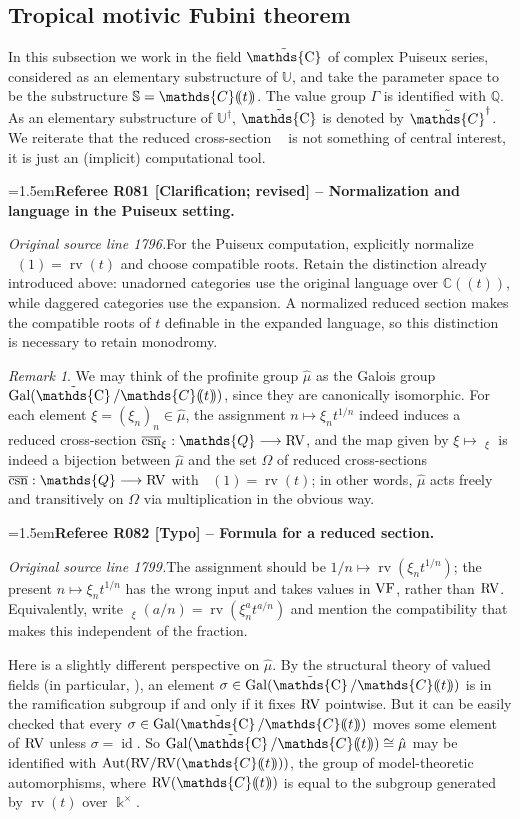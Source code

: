 \documentclass[12pt]{amsart}
\newcommand{\RefereeRemark}[4]{%
  \par\medskip\begingroup\normalfont\small\color{RefereePurple}%
  \emergencystretch=1.5em\noindent\textbf{Referee R#1 [#2] -- #3.}\par\nobreak\noindent #4\par
  \endgroup\medskip
}
\theoremstyle{plain}
\theoremstyle{definition}
\theoremstyle{remark}
\newtheorem{rem}[thm]{Remark}
\numberwithin{equation}{section}
\theoremstyle{plain}
\newcommand{\VF}{\textup{VF}}
\newcommand{\RV}{\textup{RV}}
\DeclareMathOperator{\id}{id}
\DeclareMathOperator{\aut}{Aut}
\DeclareMathOperator{\K}{\mathds{k}}
\newcommand{\C}{\mathds{C}}
\newcommand{\Q}{\mathds{Q}}
\newcommand{\0}{\emptyset}
\newcommand{\dpar}[1]{%
   (\mkern-4mu (#1 )\mkern-4mu )}
\newcommand{\bb}[1]{\mathbb{#1}}
\newcommand{\fun}{\longrightarrow}
\newcommand{\efun}{\longmapsto}
\DeclareMathOperator{\rv}{rv}
\DeclareMathOperator{\rcsn}{\overline {csn}}
\DeclareMathOperator{\gal}{Gal}
\DeclareMathOperator{\puC}{\tilde \C}
\begin{document}
\subsection{Tropical motivic Fubini theorem}\label{jp:fubini}

In this subsection we work in the field $\puC$ of complex Puiseux series, considered as an elementary substructure of $\bb U$, and take the parameter space  to be the substructure $\mathbb{S} = \C \dpar{ t }$. The value group $\Gamma$ is identified with $\Q$. As an elementary substructure of $\bb U^\dag$, $\puC$ is denoted by  $\tilde\C^{\dag}$. We reiterate that the reduced cross-section $\rcsn$ is not something of central interest, it is just an (implicit) computational tool.

\RefereeRemark{081}{Clarification; revised}{Normalization and language in the Puiseux setting}{%
\textit{Original source line 1796.}\quad For the Puiseux computation, explicitly normalize $\rcsn(1)=\rv(t)$ and choose compatible roots. Retain the distinction already introduced above: unadorned categories use the original language over $\mathbb C((t))$, while daggered categories use the expansion. A normalized reduced section makes the compatible roots of $t$ definable in the expanded language, so this distinction is necessary to retain monodromy.
}

\begin{rem}
We may think of the profinite group $\hat {\mu}$ as the Galois group $\gal(\puC / \C \dpar t)$, since they are canonically isomorphic. For each element $\xi = (\xi_n)_n \in \hat \mu$, the assignment $n \efun \xi_n t^{1/n}$ indeed induces a reduced cross-section $\rcsn_\xi : \Q \fun \RV$, and the map given by $\xi \efun \rcsn_\xi$ is indeed a bijection between $\hat \mu$ and the set $\Omega$ of reduced cross-sections $\rcsn : \Q \fun \RV$ with $\rcsn(1) = \rv(t)$; in other words, $\hat \mu$ acts freely and transitively on $\Omega$ via multiplication in the obvious way.

\RefereeRemark{082}{Typo}{Formula for a reduced section}{%
\textit{Original source line 1799.}\quad The assignment should be $1/n\mapsto\rv(\xi_n t^{1/n})$; the present $n\mapsto\xi_nt^{1/n}$ has the wrong input and takes values in $\VF$, rather than $\RV$. Equivalently, write $\rcsn_\xi(a/n)=\rv(\xi_n^a t^{a/n})$ and mention the compatibility that makes this independent of the fraction.
}

Here is a slightly different perspective on $\hat \mu$. By the structural theory of valued fields (in particular, \cite[Lemma~5.3.2]{engler:prestel:2005}), an element $\sigma \in \gal(\puC / \C \dpar t)$ is in the ramification subgroup if and only if it fixes $\RV$ pointwise. But it can be easily checked that every $\sigma \in \gal(\puC / \C \dpar t)$ moves some element of $\RV$ unless $\sigma = \id$. So $\gal(\puC / \C \dpar t) \cong \hat \mu$ may be identified with $\aut(\RV / \RV(\C \dpar t))$, the group of  model-theoretic automorphisms, where $\RV(\C \dpar t)$ is equal to the subgroup generated by $\rv(t)$ over $\K^\times$.
\end{rem}
\end{document}

